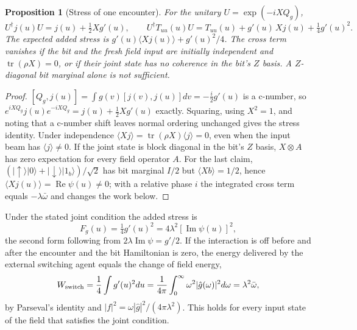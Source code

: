 \documentclass[aps,pre,onecolumn,superscriptaddress,floatfix,longbibliography]{revtex4-2}
\newtheorem{proposition}[theorem]{Proposition}
\begin{document}
\begin{proposition}[Stress of one encounter]
\label{prop:stress}
For the unitary $U=\exp(-iXQ_g)$,
\begin{equation}
U^\dagger j(u)U=j(u)+\tfrac12Xg'(u),\qquad
U^\dagger T_{uu}(u)U=T_{uu}(u)+g'(u)\,X j(u)+\tfrac14g'(u)^2 .
\label{eq:stress}
\end{equation}
The expected added stress is $g'(u)\langle Xj(u)\rangle+g'(u)^2/4$. The cross term vanishes if the bit and the fresh field input are initially independent and $\operatorname{tr}(\rho X)=0$, or if their joint state has no coherence in the bit's $Z$ basis. A $Z$-diagonal bit marginal alone is not sufficient.
\end{proposition}

\begin{proof}
$[Q_g,j(u)]=\int g(v)[j(v),j(u)]dv=-\tfrac i2g'(u)$ is a c-number, so $e^{iXQ_g}j(u)e^{-iXQ_g}=j(u)+\tfrac12Xg'(u)$ exactly. Squaring, using $X^2=1$, and noting that a c-number shift leaves normal ordering unchanged gives the stress identity. Under independence $\langle Xj\rangle=\operatorname{tr}(\rho X)\langle j\rangle=0$, even when the input beam has $\langle j\rangle\ne0$. If the joint state is block diagonal in the bit's $Z$ basis, $X\otimes A$ has zero expectation for every field operator $A$. For the last claim, $(|{\uparrow}\rangle|0\rangle+|{\downarrow}\rangle|1_b\rangle)/\sqrt2$ has bit marginal $I/2$ but $\langle Xb\rangle=1/2$, hence $\langle Xj(u)\rangle=\operatorname{Re}\psi(u)\ne0$; with a relative phase $i$ the integrated cross term equals $-\lambda\bar\omega$ and changes the work below.
\end{proof}

Under the stated joint condition the added stress is
\begin{equation}
F_g(u)=\tfrac14g'(u)^2=4\lambda^2[\operatorname{Im}\psi(u)]^2,
\label{eq:Fg}
\end{equation}
the second form following from $2\lambda\operatorname{Im}\psi=g'/2$. If the interaction is off before and after the encounter and the bit Hamiltonian is zero, the energy delivered by the external switching agent equals the change of field energy,
\begin{equation}
W_{\rm switch}=\frac14\int g'(u)^2du=\frac1{4\pi}\int_0^\infty\omega^2|\hat g(\omega)|^2d\omega=\lambda^2\bar\omega,
\label{eq:work}
\end{equation}
by Parseval's identity and $|f|^2=\omega|\hat g|^2/(4\pi\lambda^2)$. This holds for every input state of the field that satisfies the joint condition.
\end{document}
